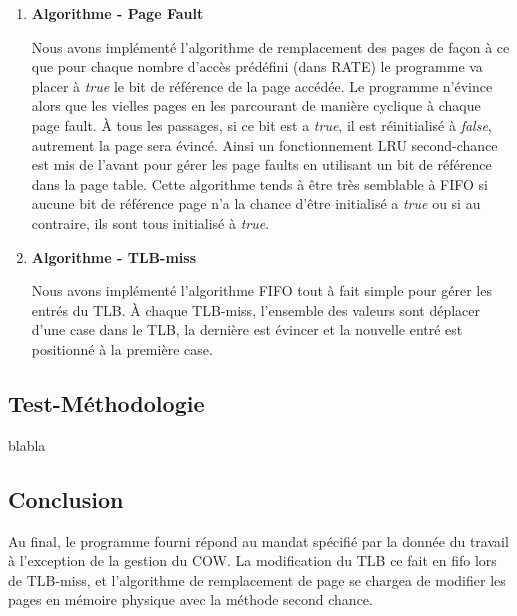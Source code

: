 \documentclass{article}
\begin{document}
\begin{enumerate}
	
	\item \textbf{Algorithme - Page Fault} 
	
  Nous avons implémenté l'algorithme de remplacement des pages de façon à ce que pour chaque nombre d'accès prédéfini (dans RATE) le programme va placer à 
  {\em true} le bit de référence de la page accédée. Le programme n'évince alors que les vielles pages en les parcourant de manière cyclique à chaque page fault. À tous les passages, si ce bit est a {\em true}, il est réinitialisé à {\em false}, autrement la page sera évincé. Ainsi un fonctionnement LRU second-chance est mis de l'avant pour gérer les page faults en utilisant un bit de référence dans la page table. Cette algorithme tends à être très semblable à FIFO si aucune bit de référence page n'a la chance d'être initialisé a {\em true} ou si au contraire, ils sont tous initialisé à {\em true}.
  
  \item \textbf{Algorithme - TLB-miss} 
  
  Nous avons implémenté l'algorithme FIFO tout à fait simple pour gérer les entrés du TLB. À chaque TLB-miss,
  l'ensemble des valeurs sont déplacer d'une case dans le TLB, la dernière est évincer et la nouvelle entré est positionné à la première case.
	
	
\end{enumerate}


\subsection*{Test-Méthodologie}

blabla


\subsection*{Conclusion}
Au final, le programme fourni répond au mandat spécifié par la donnée du travail à l'exception de la gestion du COW. La modification du TLB ce fait en fifo lors de TLB-miss, et l'algorithme de remplacement de page se chargea de modifier les pages en mémoire physique avec la méthode second chance. 
\end{document}
